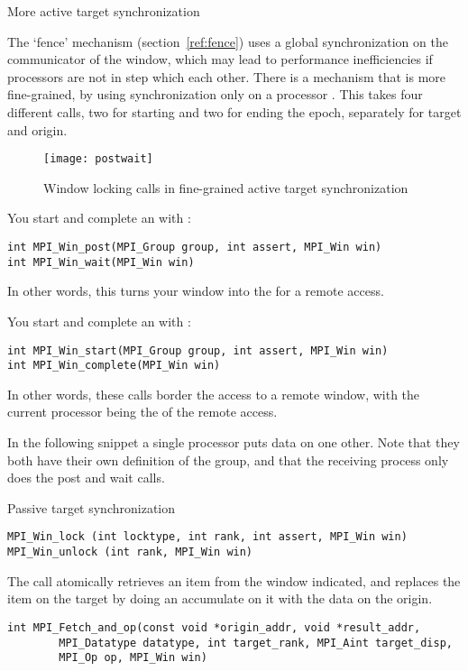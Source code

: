  {More active target synchronization}

The `fence' mechanism (section~\ref{ref:fence}) uses a global synchronization on the
communicator of the window, which may 
lead to performance inefficiencies if processors are not in step which each other. 
There is a mechanism that is more fine-grained, by using synchronization only 
on a processor . This takes four different calls, two for starting
and two for ending the epoch, separately for target and origin.
\begin{figure}[ht]
  \texttt{[image: postwait]}
  \caption{Window locking calls in fine-grained active target synchronization}
  \label{fig:postwait}
\end{figure}

You start and complete an  with%
:
\begin{verbatim}
int MPI_Win_post(MPI_Group group, int assert, MPI_Win win)
int MPI_Win_wait(MPI_Win win)
\end{verbatim}
In other words, this turns your window into the  for a remote access.

You start and complete an  with%
:
\begin{verbatim}
int MPI_Win_start(MPI_Group group, int assert, MPI_Win win)
int MPI_Win_complete(MPI_Win win)
\end{verbatim}
In other words, these calls border the access to a remote window, with the current processor
being the  of the remote access.

In the following snippet a single processor puts data on one
other. Note that they both have their own definition of the group, and
that the receiving process only does the post and wait calls.

 {Passive target synchronization}

\begin{verbatim}
MPI_Win_lock (int locktype, int rank, int assert, MPI_Win win)
MPI_Win_unlock (int rank, MPI_Win win)
\end{verbatim}

The  call atomically retrieves an item from the window
indicated, and replaces the item on the target by doing an accumulate on it
with the data on the origin.
\begin{verbatim}
int MPI_Fetch_and_op(const void *origin_addr, void *result_addr,
        MPI_Datatype datatype, int target_rank, MPI_Aint target_disp,
        MPI_Op op, MPI_Win win)
\end{verbatim}

